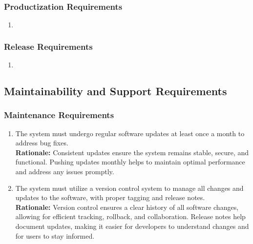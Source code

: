 \documentclass[]{article}
\begin{document}
\subsubsection{Productization Requirements}
\label{ssub:productization_requirements}
\begin{enumerate}[{OE-P}1. ]
	\item 
\end{enumerate}

\subsubsection{Release Requirements}
\label{ssub:release_requirements}
\begin{enumerate}[{OE-R}1. ]
	\item 
\end{enumerate}


\subsection{Maintainability and Support Requirements}
\label{sub:maintainability_and_support_requirements}

\subsubsection{Maintenance Requirements}
\label{ssub:maintenance_requirements}
\begin{enumerate}[{MS-M}1. ]
	\item The system must undergo regular software updates at least once a month to address bug fixes.\\
	\textbf{Rationale:} Consistent updates ensure the system remains stable, secure, and functional. Pushing updates monthly helps to maintain optimal performance and address any issues promptly.
	\item The system must utilize a version control system to manage all changes and updates to the software, with proper tagging and release notes.\\
	\textbf{Rationale:} Version control ensures a clear history of all software changes, allowing for efficient tracking, rollback, and collaboration. Release notes help document updates, making it easier for developers to understand changes and for users to stay informed.
\end{enumerate}
\end{document}
